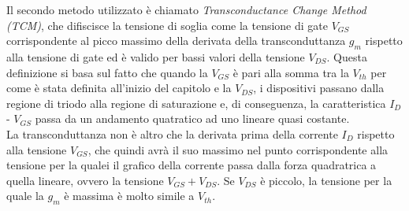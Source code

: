 \documentclass[12pt, letterpaper]{book}
\begin{document}
Il secondo metodo utilizzato è chiamato \emph{Transconductance Change Method (TCM)}, che difiscisce la tensione di soglia come la tensione di gate $V_{GS}$ corrispondente al picco massimo della derivata della transconduttanza $g_m$ rispetto alla tensione di gate ed è valido per bassi valori della tensione $V_{DS}$. Questa definizione si basa sul fatto che quando la $V_{GS}$ è pari alla somma tra la $V_{th}$ per come è stata definita all'inizio del capitolo e la $V_{DS}$, i dispositivi passano dalla regione di triodo alla regione di saturazione e, di conseguenza, la caratteristica $I_D$ - $V_{GS}$ passa da un andamento quatratico ad uno lineare quasi costante. \\
La transconduttanza non è altro che la derivata prima della corrente $I_D$ rispetto alla tensione $V_{GS}$, che quindi avrà il suo massimo nel punto corrispondente alla tensione per la qualei il grafico della corrente passa dalla forza quadratrica a quella lineare, ovvero la tensione $V_{GS}+V_{DS}$. Se $V_{DS}$ è piccolo, la tensione per la quale la $g_m$ è massima è molto simile a $V_{th}$.
\end{document}
